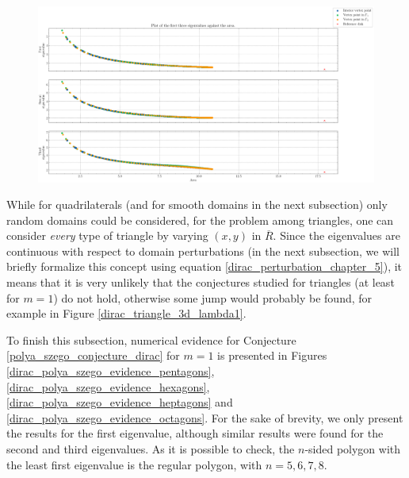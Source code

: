 \begin{figure}[!htb]
    \centering
    \includegraphics[width=\linewidth]{Images/Dirac/triangles/triangle_perimeter_first_eigenvalues.png}
    \label{dirac_triangle_model_perimeter}
\end{figure}

While for quadrilaterals (and for smooth domains in the next subsection) only random domains could be considered, for the problem among triangles, one can consider \textit{every} type of triangle by varying \((x,y)\) in \(\overline{R}\). Since the eigenvalues are continuous with respect to domain perturbations (in the next subsection, we will briefly formalize this concept using equation \eqref{dirac_perturbation_chapter_5}), it means that it is very unlikely that the conjectures studied for triangles (at least for \(m=1\)) do not hold, otherwise some jump would probably be found, for example in Figure \ref{dirac_triangle_3d_lambda1}. 

To finish this subsection, numerical evidence for Conjecture \ref{polya_szego_conjecture_dirac} for \(m=1\) is presented in Figures \ref{dirac_polya_szego_evidence_pentagons}, \ref{dirac_polya_szego_evidence_hexagons}, \ref{dirac_polya_szego_evidence_heptagons} and \ref{dirac_polya_szego_evidence_octagons}. For the sake of brevity, we only present the results for the first eigenvalue, although similar results were found for the second and third eigenvalues. As it is possible to check, the \(n\)-sided polygon with the least first eigenvalue is the regular polygon, with \(n=5,6,7,8\).

